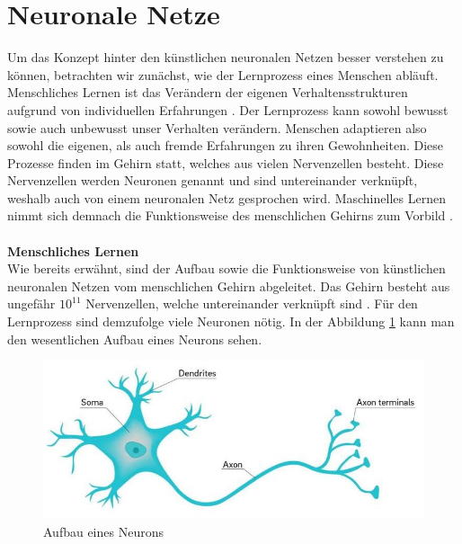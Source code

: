   \section{Neuronale Netze}\label{s.neuronalenetze}
Um das Konzept hinter den künstlichen neuronalen Netzen besser verstehen zu können, betrachten wir zunächst, wie der Lernprozess eines Menschen abläuft. Menschliches Lernen ist das Verändern der eigenen Verhaltensstrukturen aufgrund von individuellen Erfahrungen \cite{hoffmann2016lern}. Der Lernprozess kann sowohl bewusst sowie auch unbewusst unser Verhalten verändern. Menschen adaptieren also sowohl die eigenen, als auch fremde Erfahrungen zu ihren Gewohnheiten. Diese Prozesse finden im Gehirn statt, welches aus vielen Nervenzellen besteht. Diese Nervenzellen werden Neuronen genannt und sind untereinander verknüpft, weshalb auch von einem neuronalen Netz gesprochen wird. Maschinelles Lernen nimmt sich demnach die Funktionsweise des menschlichen Gehirns zum Vorbild \cite[1]{ertel2013grundkurs}.\\\\
\textbf{Menschliches Lernen}\\
Wie bereits erwähnt, sind der Aufbau sowie die Funktionsweise von künstlichen neuronalen Netzen vom menschlichen Gehirn abgeleitet. Das Gehirn besteht aus ungefähr $10^{11}$ Nervenzellen, welche untereinander verknüpft sind \cite[265ff.]{ertel2013grundkurs}. Für den Lernprozess sind demzufolge viele Neuronen nötig. In der Abbildung \ref{img:neuron} kann man den wesentlichen Aufbau eines Neurons sehen.
\begin{figure}
	[h]
	\centering
	\includegraphics[scale=0.7]{Sources/neuron.jpg}
	\caption{Aufbau eines Neurons \cite{neuron2018UoC}}
	\label{img:neuron}
\end{figure}\\
